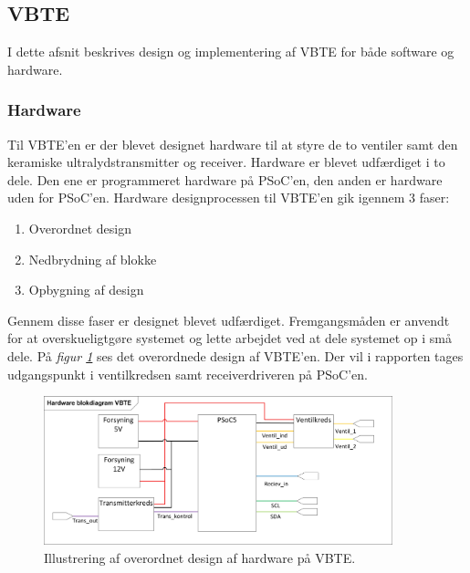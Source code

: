 \subsection{VBTE}
I dette afsnit beskrives design og implementering af VBTE for både software og hardware. 
\subsubsection{Hardware}
Til VBTE'en er der blevet designet hardware til at styre de to ventiler samt den keramiske ultralydstransmitter og receiver. Hardware er blevet udfærdiget i to dele. Den ene er programmeret hardware på PSoC'en, den anden er hardware uden for PSoC'en. Hardware designprocessen til VBTE'en gik igennem 3 faser:
\begin{enumerate}
\item Overordnet design
\item Nedbrydning af blokke
\item Opbygning af design
\end{enumerate}
Gennem disse faser er designet blevet udfærdiget. Fremgangsmåden er anvendt for at overskueligtgøre systemet og lette arbejdet ved at dele systemet op i små dele. På \textit{figur \ref{fig:HWVBTE}} ses det overordnede design af VBTE'en. Der vil i rapporten tages udgangspunkt i ventilkredsen samt receiverdriveren på PSoC'en.
\begin{figure}[H]
\centering
\includegraphics[width = 0.9\textwidth]{billeder/HWVBTE}
\caption{Illustrering af overordnet design af hardware på VBTE.}
\label{fig:HWVBTE}
\end{figure}
